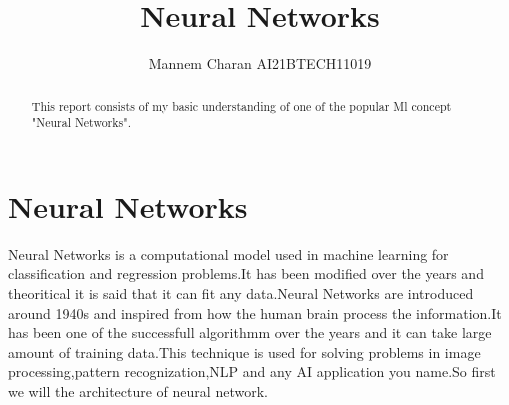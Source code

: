 \documentclass[journal,12pt,onecolumn]{IEEEtran}
\theoremstyle{remark}
\numberwithin{equation}{section}
\begin{document}
		\title{Neural Networks}
		\author{ Mannem Charan AI21BTECH11019}
		 \maketitle
		\begin{abstract}
			This report consists of my basic understanding of one of the popular Ml concept "Neural Networks".
		\end{abstract}
                \section{Neural Networks}
                 Neural Networks is a computational model used in machine learning for classification and regression problems.It has been modified over the years and theoritical it is said that it can fit any data.Neural Networks are introduced around 1940s and inspired from how the human brain process the information.It has been one of the successfull algorithmm over the years and it can take large amount of training data.This technique is used for solving problems in image processing,pattern recognization,NLP and any AI application you name.So first we will the architecture of neural network.
\end{document}

